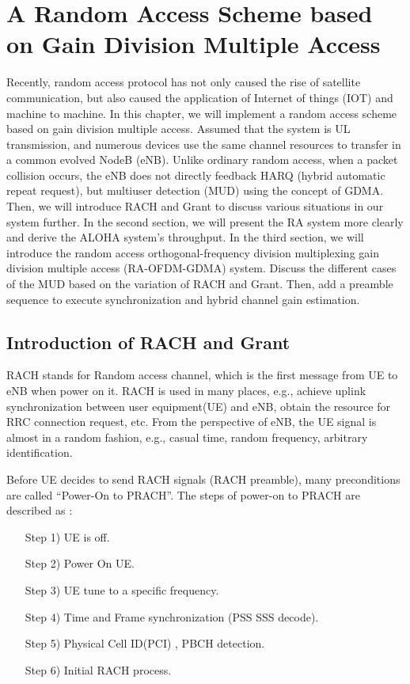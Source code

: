 \chapter{A Random Access Scheme based on Gain Division Multiple Access}
\label{c:rach_gdma}

Recently, random access protocol has not only caused the rise of satellite communication, but also caused the application of Internet of things (IOT) and machine to machine. In this chapter, we will implement a random access scheme based on gain division multiple access. Assumed that the system is UL transmission, and numerous devices use the same channel resources to transfer in a common evolved NodeB (eNB). Unlike ordinary random access, when a packet collision occurs, the eNB does not directly feedback HARQ (hybrid automatic repeat request), but multiuser detection (MUD) using the concept of GDMA. Then, we will introduce RACH and Grant to discuss various situations in our system further. In the second section, we will present the RA system more clearly and derive the ALOHA system's throughput. In the third section, we will introduce the random access orthogonal-frequency division multiplexing gain division multiple access (RA-OFDM-GDMA) system. Discuss the different cases of the MUD based on the variation of RACH and Grant. Then, add a preamble sequence to execute synchronization and hybrid channel gain estimation.


\section{Introduction of RACH and Grant}

RACH stands for Random access channel, which is the first message from UE to eNB when power on it. RACH is used in many places, e.g., achieve uplink synchronization between user equipment(UE) and eNB, obtain the resource for RRC connection request, etc. From the perspective of eNB, the UE signal is almost in a random fashion, e.g., casual time, random frequency, arbitrary identification. 

Before UE decides to send RACH signals (RACH preamble), many preconditions are called “Power-On to PRACH”. The steps of power-on to PRACH are described as :

\begin{enumerate}[leftmargin=\leftmargin+\widthof{Prefix}]
\item[Step 1)] UE is off.
\item[Step 2)] Power On UE.
\item[Step 3)] UE tune to a specific frequency.
\item[Step 4)] Time and Frame synchronization (PSS SSS decode).
\item[Step 5)] Physical Cell ID(PCI) , PBCH detection.
\item[Step 6)] Initial RACH process.
\end{enumerate}

